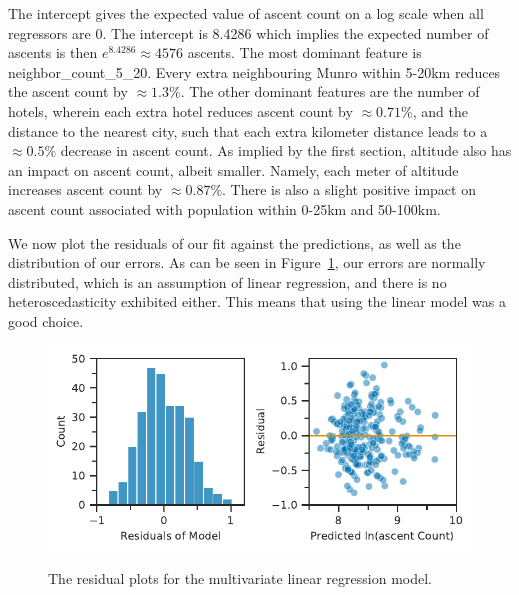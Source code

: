 \documentclass[11pt,a4paper]{article}
\begin{document}
The intercept gives the expected value of ascent count on a log scale when all regressors are 0. The intercept is 8.4286 which implies the expected number of ascents is then $e^{8.4286} \approx 4576$ ascents. The most dominant feature is neighbor\_count\_5\_20. Every extra neighbouring Munro within 5-20km reduces the ascent count by $ \approx 1.3\%$. The other dominant features are the number of hotels, wherein each extra hotel reduces ascent count by $\approx 0.71\%$, and the distance to the nearest city, such that each extra kilometer distance leads to a $\approx 0.5\%$ decrease in ascent count. As implied by the first section, altitude also has an impact on ascent count, albeit smaller. Namely, each meter of altitude increases ascent count by $\approx 0.87\%$. There is also a slight positive impact on ascent count associated with population within 0-25km and 50-100km.

We now plot the residuals of our fit against the predictions, as well as the distribution of our errors. As can be seen in Figure~\ref{fds-project-template:fig:multi_residuals_dist}, our errors are normally distributed, which is an assumption of linear regression, and there is no heteroscedasticity exhibited either. This means that using the linear model was a good choice.
\begin{figure} [h!]
    \centering
    \includegraphics{report/multi_residuals_dist.pdf}
    \begin{minipage}[t]{.5\linewidth}
        \centering
        \label{fds-project-template:fig:mul_residuals_dist}
    \end{minipage}%
    \begin{minipage}[t]{.5\linewidth}
        \centering
        \label{fds-project-template:fig:mul_residuals_yhat}
    \end{minipage}
    \caption{The residual plots for the multivariate linear regression model.}
    \label{fds-project-template:fig:multi_residuals_dist}
\end{figure}
\end{document}
